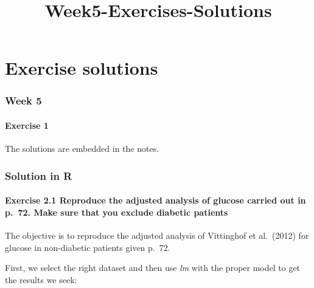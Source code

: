 \documentclass[
  letterpaper,
  DIV=11,
  numbers=noendperiod]{scrreprt}
\title{Week5-Exercises-Solutions}
\author{}
\date{}
\begin{document}
\maketitle


\chapter{Exercise solutions}\label{exercise-solutions}

\subsection*{Week 5}\label{week-5}

\subsubsection*{Exercise 1}\label{exercise-1}

The solutions are embedded in the notes.

\subsection{\texorpdfstring{\textbf{Solution in
R}}{Solution in R}}\label{solution-in-r}

\subsubsection*{Exercise 2.1 Reproduce the adjusted analysis of glucose
carried out in p.~72. Make sure that you exclude diabetic
patients}\label{exercise-2.1-reproduce-the-adjusted-analysis-of-glucose-carried-out-in-p.-72.-make-sure-that-you-exclude-diabetic-patients}

The objective is to reproduce the adjusted analysis of Vittinghof et
al.~(2012) for glucose in non-diabetic patients given p.~72.

First, we select the right dataset and then use \emph{lm} with the
proper model to get the results we seek:
\end{document}
